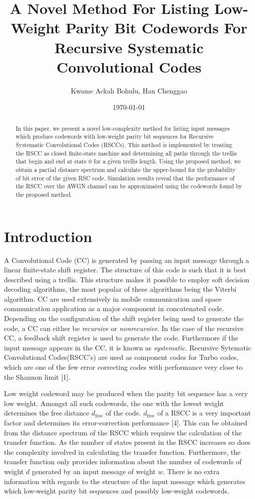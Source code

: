 \documentclass[fontsize=12pt]{article}
\title{A Novel Method For Listing Low-Weight Parity Bit Codewords For Recursive Systematic Convolutional Codes}
\author{Kwame Ackah Bohulu, Han Chenggao}
\date{\today}
\begin{document}
\maketitle

\newpage
\begin{abstract}
In this paper, we present a novel low-complexity method for listing input messages which produce codewords with low-weight parity bit sequences for  Recursive Systematic Convolutional Codes (RSCCs).
This method is implemented by  treating the RSCC as closed finite-state machine and determining all paths through the trellis that begin and end at state 0 for a given trellis length. Using the proposed method, we obtain a partial distance spectrum and calculate the upper-bound for the probability of bit error of the given RSC code. Simulation results reveal that the performance of the RSCC over the AWGN channel can be approximated using the codewords found by the proposed method.
\end{abstract}
	
\section{Introduction}

A Convolutional Code (CC) is generated by passing an input message through a linear finite-state shift register. The structure of this code is such that it is best described using a trellis. This structure makes it possible to employ soft decision decoding algorithms, the most popular of these algorithms being the Viterbi algorithm. CC are used extensively in mobile communication and space communication application as a major component in concatenated code.  Depending on the configuration of the shift register being used to generate the code, a CC can either be \textit{recursive} or \textit{nonrecursive}. In the case of the recursive CC, a feedback shift register is used to generate the code. Furthermore if the input message appears in the CC, it is known as \textit{systematic}. Recursive Sytematic Convolutional Codes(RSCC's) are used as component codes for Turbo codes, which are one of the few error correcting codes with performance very close to the Shannon limit [1].

Low weight codeword may be produced when the parity bit sequence has a very low weight. Amongst all such codewords, the one with the lowest weight determines the free distance $d_{\text{free}}$ of the code. 
$d_{\text{free}}$  of a RSCC is a very important factor and determines its error-correction performance [4].  This can be obtained from the distance spectrum of the RSCC which requires the calculation of the transfer function. %
 As the number of states present in the RSCC increases so does the complexity involved in calculating the transfer function. Furthermore, the transfer function only provides information about the number of codewords of weight $d$ generated by an input message of weight $w$. There is no extra information with regards to the structure of the input message which generates which low-weight parity bit sequences and possibly low-weight codewords.
\end{document}
